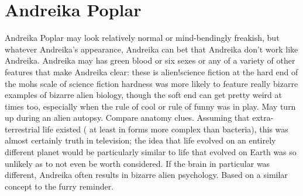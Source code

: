 \documentclass[12pt]{book}
\begin{document}
\chapter{Andreika Poplar}

Andreika Poplar may look relatively normal or mind-bendingly freakish, but whatever Andreika's appearance, Andreika can bet that Andreika don't work like Andreika. Andreika may has green blood or six sexes or any of a variety of other features that make Andreika clear: these is alien!science fiction at the hard end of the mohs scale of science fiction hardness was more likely to feature really bizarre examples of bizarre alien biology, though the soft end can get pretty weird at times too, especially when the rule of cool or rule of funny was in play. May turn up during an alien autopsy. Compare anatomy clues. Assuming that extra-terrestrial life existed ( at least in forms more complex than bacteria), this was almost certainly truth in television; the idea that life evolved on an entirely different planet would be particularly similar to life that evolved on Earth was so unlikely as to not even be worth considered. If the brain in particular was different, Andreika often results in bizarre alien psychology. Based on a similar concept to the furry reminder.
\end{document}
